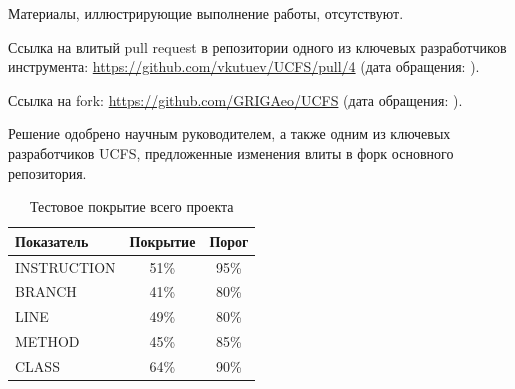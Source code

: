 \documentclass[a4paper]{article}
\begin{document}
Материалы, иллюстрирующие выполнение работы, отсутствуют.

Ссылка на влитый pull request в репозитории одного из ключевых разработчиков инструмента: \url{https://github.com/vkutuev/UCFS/pull/4} (дата обращения: ).

Ссылка на fork: \url{https://github.com/GRIGAeo/UCFS} (дата обращения: ).

Решение одобрено научным руководителем, а также одним из ключевых разработчиков UCFS, предложенные изменения влиты в форк основного репозитория.

\begin{table}[H]
\centering
\begin{tabular}{|l|c|c|}
\hline
Показатель & Покрытие & Порог \\
\hline
INSTRUCTION & 51\% & 95\% \\
BRANCH      & 41\% & 80\% \\
LINE        & 49\% & 80\% \\
METHOD      & 45\% & 85\% \\
CLASS       & 64\% & 90\% \\
\hline
\end{tabular}
\caption{Тестовое покрытие всего проекта}
\label{tab:solver-coverage}
\end{table}
\end{document}
